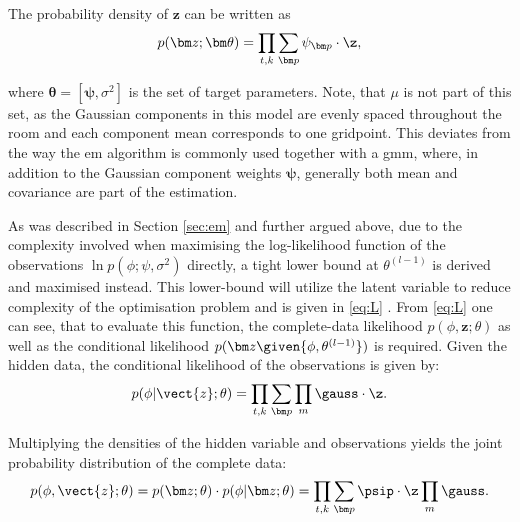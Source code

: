 The probability density of $\bm z$ can be written as  %
\begin{equation}
    p(\bm z;\bm\theta)=\prod_{t,k}\sum_{\bm p}\psi_{\bm p}\cdot\z,
\end{equation}

where $\bm\theta=[\bm\psi,\sigma^2]$ is the set of target parameters. Note, that $\mu$ is not part of this set, as the Gaussian components in this model are evenly spaced throughout the room and each component mean corresponds to one gridpoint. This deviates from the way the \gls{em} algorithm is commonly used together with a \gls{gmm}, where, in addition to the Gaussian component weights $\bm\psi$, generally both mean and covariance are part of the estimation.

As was described in Section \ref{sec:em} and further argued above, due to the complexity involved when maximising the log-likelihood function of the observations $\ln p(\phi;\psi, \sigma^2)$ directly, a tight lower bound at $\theta^{(l-1)}$ is derived and maximised instead. This lower-bound will utilize the latent variable to reduce complexity of the optimisation problem and is given in \eqref{eq:L} . From \eqref{eq:L} one can see, that to evaluate this function, the complete-data likelihood $p(\phi,\bm z; \theta)$ as well as the conditional likelihood $p(\bm z\given{\phi, \theta^{(l-1)}})$ is required. Given the hidden data, the conditional likelihood of the observations is given by:
\begin{equation}
    p(\phi |\vect{z};\theta)=\prod_{t,k}\sum_{\bm p}\prod_{m}\gauss\cdot\z.
\end{equation}

Multiplying the densities of the hidden variable and observations yields the joint probability distribution of the complete data:
\begin{equation}
    p(\phi,\vect{z};\theta)=p(\bm z;\theta)\cdot p(\phi |\bm z;\theta)=\prod_{t,k}\sum_{\bm p}\psip\cdot\z\prod_{m}\gauss .
\end{equation}


